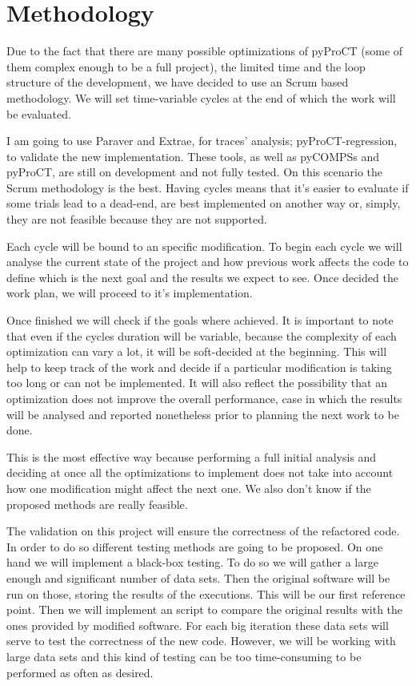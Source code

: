 \section{Methodology}
\label{sec:methodology}
Due to the fact that there are many possible optimizations of pyProCT (some of them complex enough to be a full project), the limited time and the loop structure of the development, we have decided to use an Scrum based methodology. We will set time-variable cycles at the end of which the work will be evaluated. 

I am going to use Paraver and Extrae, for traces' analysis; pyProCT-regression, to validate the new implementation. These tools, as well as pyCOMPSs and pyProCT, are still on development and not fully tested. On this scenario the Scrum methodology is the best. Having cycles means that it's easier to evaluate if some trials lead to a dead-end, are best implemented on another way or, simply, they are not feasible because they are not supported.

Each cycle will be bound to an specific modification. To begin each cycle we will analyse the current state of the project and how previous work affects the code to define which is the next goal and the results we expect to see. Once decided the work plan, we will proceed to it's implementation. 

Once finished we will check if the goals where achieved. It is important to note that even if the cycles duration will be variable, because the complexity of each optimization can vary a lot, it will be soft-decided at the beginning. This will help to keep track of the work and decide if a particular modification is taking too long or can not be implemented. It will also reflect the possibility that an optimization does not improve the overall performance, case in which the results will be analysed and reported nonetheless prior to planning the next work to be done.

This is the most effective way because performing a full initial analysis and deciding at once all the optimizations to implement does not take into account how one modification might affect the next one. We also don't know if the proposed methods are really feasible.

The validation on this project will ensure the correctness of the refactored code. In order to do so different testing methods are going to be proposed. On one hand we will implement a black-box testing. To do so we will gather a large enough and significant number of data sets. Then the original software will be run on those, storing the results of the executions. This will be our first reference point. Then we will implement an script to compare the original results with the ones provided by modified software. For each big iteration these data sets will serve to test the correctness of the new code. However, we will be working with large data sets and this kind of testing can be too time-consuming to be performed as often as desired. 

